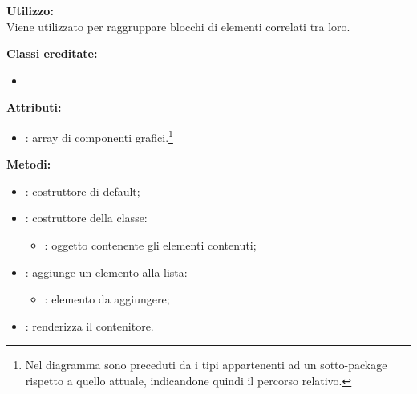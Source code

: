 \textbf{Utilizzo:}\\
Viene utilizzato per raggruppare blocchi di elementi correlati tra loro.

\textbf{Classi ereditate:}
\begin{itemize}
	\item {}
\end{itemize}


\textbf{Attributi:}
\begin{itemize}
	\item {}: array di componenti grafici.\footnote{Nel diagramma sono preceduti da \virgolette{>>} i tipi appartenenti ad un sotto-package rispetto a quello attuale, indicandone quindi il percorso relativo.}
\end{itemize}

\textbf{Metodi:}
\begin{itemize}
	\item {}: costruttore di default;
	\item {}: costruttore della classe:
	\begin{itemize}
		\item {}: oggetto contenente gli elementi contenuti;
	\end{itemize}
	\item {}: aggiunge un elemento alla lista:
	\begin{itemize}
		\item {}: elemento da aggiungere;
	\end{itemize}
	\item {}: renderizza il contenitore.
\end{itemize}

